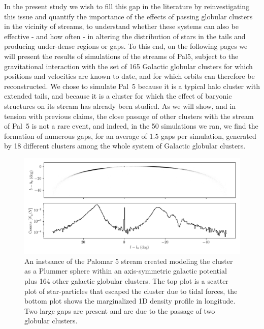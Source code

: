 \documentclass{aa}
\begin{document}
  In the present study we wish to fill this gap in the literature by reinvestigating this issue and quantify the importance of the effects of passing globular clusters in the vicinity of streams, to understand whether these systems can also be effective - and how often - in altering the distribution of stars in the tails and producing under-dense regions or gaps. To this end, on the following pages we will present the results of simulations of the streams of Pal5, subject to the gravitational interaction with the set of 165 Galactic globular clusters for which positions and velocities are known to date, and for which orbits can therefore be reconstructed. We chose to simulate Pal~5 because it is a typical halo cluster with extended tails, and because it is a cluster for which the effect of baryonic structures on its stream has already been studied. As we will show, and in tension with previous claims, the close passage of other clusters with the stream of Pal~5 is not a rare event, and indeed, in the 50 simulations we ran, we find the formation of numerous gaps, for an average of 1.5 gaps per simulation, generated by 18 different clusters among the whole system of Galactic globular clusters.

  \begin{figure}
    \centering
    \includegraphics[width=\linewidth]{stream_on_sky_Pal5_monte-carlo-009_pouliasis2017pii-GCNBody.png}
    \caption{An instsance of the Palomar 5 stream created modeling the cluster as a Plummer sphere within an axis-symmetric galactic potential plus 164 other galactic globular clusters. The top plot is a scatter plot of star-particles that escaped the cluster due to tidal forces, the bottom plot shows the marginalized 1D density profile in longitude. Two large gaps are present and are due to the passage of two globular clusters.}
    \label{fig:stream_on_sky}
    \end{figure}
\end{document}
